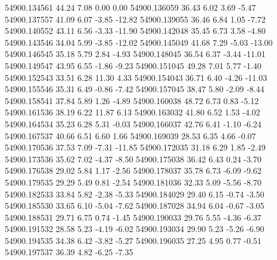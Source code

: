 54900.134561       44.24        7.08        0.00        0.00
54900.136059       36.43        6.02        3.69       -5.47
54900.137557       41.09        6.07       -3.85      -12.82
54900.139055       36.46        6.84        1.05       -7.72
54900.140552       43.11        6.56       -3.33      -11.90
54900.142048       35.45        6.73        3.58       -4.80
54900.143546       34.04        5.99       -3.85      -12.02
54900.145049       41.68        7.29       -5.03      -13.00
54900.146545       35.18        5.79        2.84       -4.93
54900.148045       36.54        6.37       -3.44      -11.01
54900.149547       43.95        6.55       -1.86       -9.23
54900.151045       49.28        7.01        5.77       -1.40
54900.152543       33.51        6.28       11.30        4.33
54900.154043       36.71        6.40       -4.26      -11.03
54900.155546       35.31        6.49       -0.86       -7.42
54900.157045       38.47        5.80       -2.09       -8.44
54900.158541       37.84        5.89        1.26       -4.89
54900.160038       48.72        6.73        0.83       -5.12
54900.161536       38.19        6.22       11.87        6.13
54900.163032       41.80        6.52        1.53       -4.02
54900.164534       35.23        6.28        5.31       -0.03
54900.166037       42.76        6.41       -1.10       -6.24
54900.167537       40.66        6.51        6.60        1.66
54900.169039       28.53        6.35        4.66       -0.07
54900.170536       37.53        7.09       -7.31      -11.85
54900.172035       31.18        6.29        1.85       -2.49
54900.173536       35.62        7.02       -4.37       -8.50
54900.175038       36.42        6.43        0.24       -3.70
54900.176538       29.02        5.84        1.17       -2.56
54900.178037       35.78        6.73       -6.09       -9.62
54900.179535       29.29        5.49        0.81       -2.54
54900.181036       32.33        5.09       -5.56       -8.70
54900.182533       33.84        5.82       -2.38       -5.33
54900.184029       29.40        6.15       -0.74       -3.50
54900.185530       33.65        6.10       -5.04       -7.62
54900.187028       34.94        6.04       -0.67       -3.05
54900.188531       29.71        6.75        0.74       -1.45
54900.190033       29.76        5.55       -4.36       -6.37
54900.191532       28.58        5.23       -4.19       -6.02
54900.193034       29.90        5.23       -5.26       -6.90
54900.194535       34.38        6.42       -3.82       -5.27
54900.196035       27.25        4.95        0.77       -0.51
54900.197537       36.39        4.82       -6.25       -7.35
